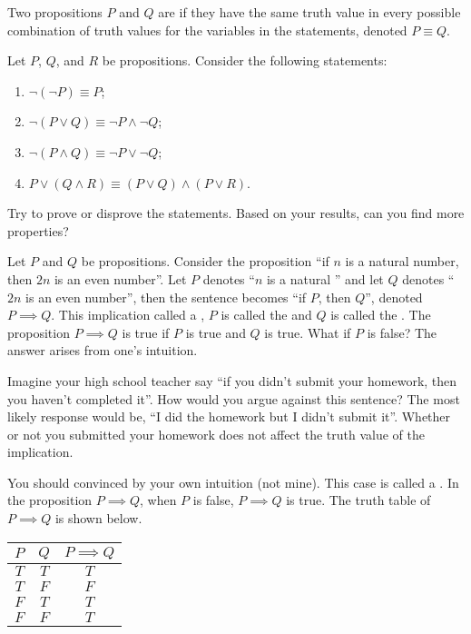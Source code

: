 \documentclass[10pt]{article}
\begin{document}
\par
Two propositions $P$ and $Q$ are  if they have the same truth value in every possible combination of truth values for the variables in the statements, denoted $P\equiv Q$.
\begin{example}
    Let $P$, $Q$, and $R$ be propositions. Consider the following statements:
    \begin{enumerate}
        \item $\neg(\neg P)\equiv P$;
        \item $\neg(P\vee Q)\equiv\neg P\wedge\neg Q$;
        \item $\neg(P\wedge Q)\equiv\neg P\vee\neg Q$;
        \item $P\vee(Q\wedge R)\equiv(P\vee Q)\wedge(P\vee R)$.
    \end{enumerate}
    Try to prove or disprove the statements. Based on your results, can you find more properties?
\end{example}
\par
Let $P$ and $Q$ be propositions. Consider the proposition ``if $n$ is a natural number, then $2n$ is an even number''. Let $P$ denotes ``$n$ is a natural '' and let $Q$ denotes ``$2n$ is an even number'', then the sentence becomes ``if $P$, then $Q$'', denoted $P\implies Q$. This implication called a , $P$ is called the  and $Q$ is called the . The proposition $P\implies Q$ is true if $P$ is true and $Q$ is true. What if $P$ is false? The answer arises from one's intuition.
\begin{example}
    Imagine your high school teacher say ``if you didn't submit your homework, then you haven't completed it''. How would you argue against this sentence? The most likely response would be, ``I did the homework but I didn't submit it''. Whether or not you submitted your homework does not affect the truth value of the implication.
\end{example}
\par
You should convinced by your own intuition (not mine). This case is called a . In the proposition $P\implies Q$, when $P$ is false, $P\implies Q$ is true. The truth table of $P\implies Q$ is shown below.
\begin{center}
    \begin{tabular}{cc|c}
        $P$ & $Q$ & $P\implies Q$ \\
        \hline
        $T$ & $T$ & $T$ \\
        $T$ & $F$ & $F$ \\
        $F$ & $T$ & $T$ \\
        $F$ & $F$ & $T$
    \end{tabular}
\end{center}
\end{document}
